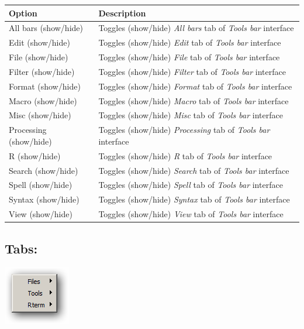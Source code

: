\begin{scriptsize}\begin{tabularx}{\textwidth}{>{\hsize=0.3\hsize}X>{\hsize=0.7\hsize}X}\\
    \hline
    \textbf{Option} & \textbf{Description} \\
    \hline
    All bars (show/hide) & Toggles (show/hide) \textit{All bars} tab of \textit{Tools bar} interface \\
    Edit (show/hide) & Toggles (show/hide) \textit{Edit} tab of \textit{Tools bar} interface \\
    File (show/hide) & Toggles (show/hide) \textit{File} tab of \textit{Tools bar} interface \\
    Filter (show/hide) & Toggles (show/hide) \textit{Filter} tab of \textit{Tools bar} interface \\
    Format (show/hide) & Toggles (show/hide) \textit{Format} tab of \textit{Tools bar} interface \\
    Macro (show/hide) & Toggles (show/hide) \textit{Macro} tab of \textit{Tools bar} interface \\
    Misc (show/hide) & Toggles (show/hide) \textit{Misc} tab of \textit{Tools bar} interface \\
    Processing (show/hide) & Toggles (show/hide) \textit{Processing} tab of \textit{Tools bar} interface \\
    R (show/hide) & Toggles (show/hide) \textit{R} tab of \textit{Tools bar} interface \\
    Search (show/hide) & Toggles (show/hide) \textit{Search} tab of \textit{Tools bar} interface \\
    Spell (show/hide) & Toggles (show/hide) \textit{Spell} tab of \textit{Tools bar} interface \\
    Syntax (show/hide) & Toggles (show/hide) \textit{Syntax} tab of \textit{Tools bar} interface \\
    View (show/hide) & Toggles (show/hide) \textit{View} tab of \textit{Tools bar} interface \\
    \hline
  \end{tabularx}\end{scriptsize}


\hypertarget{menu_view_tabs}{}
\subsection{Tabs:}

\includegraphics[scale=0.50]{./res/menu_view_tabs.png}\\


